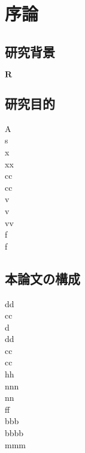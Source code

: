 \chapter{序論}
\section{研究背景}
$\bm{R}$
\section{研究目的}
A \\
s \\
x\\
xx\\
cc \\
cc\\
v\\
v\\
vv\\
f\\
f\\
\section{本論文の構成}
dd\\
cc \\
d\\
dd\\
cc\\
cc\\
hh\\
nnn\\
nn\\
ff\\
bbb\\
bbbb\\
mmm\\